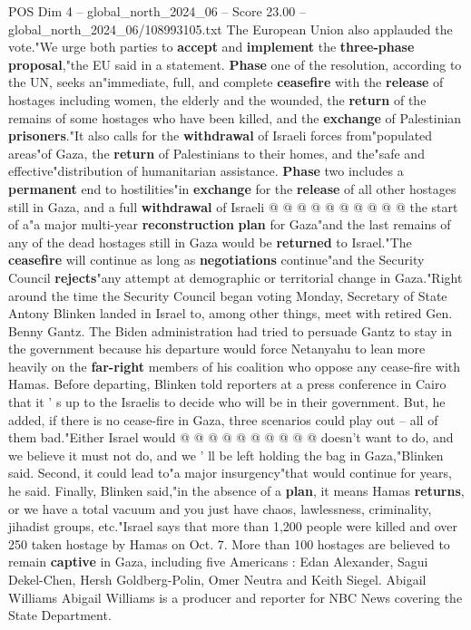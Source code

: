 \begin{textsample}{POS Dim 4 – global\_north\_2024\_06 – Score 23.00 – global\_north\_2024\_06/108993105.txt}
The European Union also applauded the vote."We urge both parties to \textbf{accept} and \textbf{implement} the \textbf{three-phase} \textbf{proposal},"the EU said in a statement. \textbf{Phase} one of the resolution, according to the UN, seeks an"immediate, full, and complete \textbf{ceasefire} with the \textbf{release} of hostages including women, the elderly and the wounded, the \textbf{return} of the remains of some hostages who have been killed, and the \textbf{exchange} of Palestinian \textbf{prisoners}."It also calls for the \textbf{withdrawal} of Israeli forces from"populated areas"of Gaza, the \textbf{return} of Palestinians to their homes, and the"safe and effective"distribution of humanitarian assistance. \textbf{Phase} two includes a \textbf{permanent} end to hostilities"in \textbf{exchange} for the \textbf{release} of all other hostages still in Gaza, and a full \textbf{withdrawal} of Israeli @ @ @ @ @ @ @ @ @ @ the start of a"a major multi-year \textbf{reconstruction} \textbf{plan} for Gaza"and the last remains of any of the dead hostages still in Gaza would be \textbf{returned} to Israel."The \textbf{ceasefire} will continue as long as \textbf{negotiations} continue"and the Security Council \textbf{rejects}"any attempt at demographic or territorial change in Gaza."Right around the time the Security Council began voting Monday, Secretary of State Antony Blinken landed in Israel to, among other things, meet with retired Gen.
Benny Gantz.
The Biden administration had tried to persuade Gantz to stay in the government because his departure would force Netanyahu to lean more heavily on the \textbf{far-right} members of his coalition who oppose any cease-fire with Hamas.
Before departing, Blinken told reporters at a press conference in Cairo that it ' s up to the Israelis to decide who will be in their government.
But, he added, if there is no cease-fire in Gaza, three scenarios could play out -- all of them bad."Either Israel would @ @ @ @ @ @ @ @ @ @ doesn't want to do, and we believe it must not do, and we ' ll be left holding the bag in Gaza,"Blinken said.
Second, it could lead to"a major insurgency"that would continue for years, he said.
Finally, Blinken said,"in the absence of a \textbf{plan}, it means Hamas \textbf{returns}, or we have a total vacuum and you just have chaos, lawlessness, criminality, jihadist groups, etc."Israel says that more than 1,200 people were killed and over 250 taken hostage by Hamas on Oct. 7.
More than 100 hostages are believed to remain \textbf{captive} in Gaza, including five Americans : Edan Alexander, Sagui Dekel-Chen, Hersh Goldberg-Polin, Omer Neutra and Keith Siegel.
Abigail Williams Abigail Williams is a producer and reporter for NBC News covering the State Department.

\end{textsample}
